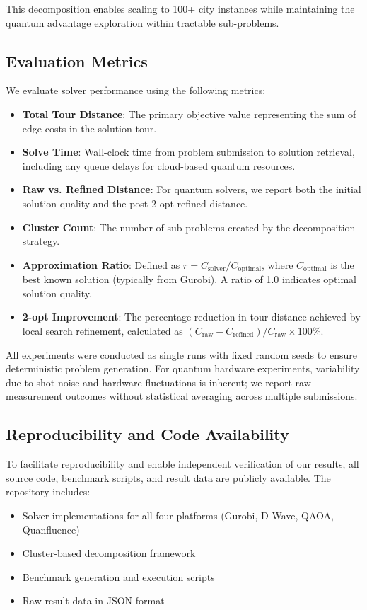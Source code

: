 \documentclass[conference]{IEEEtran}
\begin{document}
This decomposition enables scaling to 100+ city instances while maintaining the quantum advantage exploration within tractable sub-problems.

\subsection{Evaluation Metrics}

We evaluate solver performance using the following metrics:
\begin{itemize}
\item \textbf{Total Tour Distance}: The primary objective value representing the sum of edge costs in the solution tour.
\item \textbf{Solve Time}: Wall-clock time from problem submission to solution retrieval, including any queue delays for cloud-based quantum resources.
\item \textbf{Raw vs. Refined Distance}: For quantum solvers, we report both the initial solution quality and the post-2-opt refined distance.
\item \textbf{Cluster Count}: The number of sub-problems created by the decomposition strategy.
\item \textbf{Approximation Ratio}: Defined as $r = C_{\text{solver}} / C_{\text{optimal}}$, where $C_{\text{optimal}}$ is the best known solution (typically from Gurobi). A ratio of 1.0 indicates optimal solution quality.
\item \textbf{2-opt Improvement}: The percentage reduction in tour distance achieved by local search refinement, calculated as $(C_{\text{raw}} - C_{\text{refined}}) / C_{\text{raw}} \times 100\%$.
\end{itemize}

All experiments were conducted as single runs with fixed random seeds to ensure deterministic problem generation. For quantum hardware experiments, variability due to shot noise and hardware fluctuations is inherent; we report raw measurement outcomes without statistical averaging across multiple submissions.

\subsection{Reproducibility and Code Availability}

To facilitate reproducibility and enable independent verification of our results, all source code, benchmark scripts, and result data are publicly available. The repository includes:
\begin{itemize}
\item Solver implementations for all four platforms (Gurobi, D-Wave, QAOA, Quanfluence)
\item Cluster-based decomposition framework
\item Benchmark generation and execution scripts
\item Raw result data in JSON format
\end{itemize}
\end{document}
